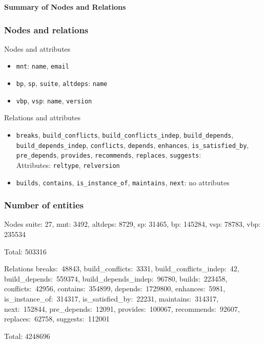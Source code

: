 \documentclass[hyperref]{beamer}
\newcommand{\cutin}[1]{%
\begin{frame}[c]\begin{center}{\Large\bf\color{myblue}#1}\end{center}\end{frame}}
\begin{document}
\cutin{Summary of Nodes and Relations}

\begin{frame}
  \frametitle{Nodes and relations}
  \begin{block}{Nodes and attributes}
    \begin{itemize}
    \item \texttt{mnt}: \texttt{name}, \texttt{email}
    \item \texttt{bp}, \texttt{sp}, \texttt{suite}, \texttt{altdeps}: \texttt{name}
    \item \texttt{vbp}, \texttt{vsp}: \texttt{name}, \texttt{version}
    \end{itemize}
  \end{block}

  \begin{block}{Relations and attributes}
    \begin{itemize}
    \item \texttt{breaks}, \texttt{build\_conflicts},
      \texttt{build\_conflicts\_indep}, \texttt{build\_depends},
      \texttt{build\_depends\_indep}, \texttt{conflicts},
      \texttt{depends}, \texttt{enhances}, \texttt{is\_satisfied\_by},
      \texttt{pre\_depends}, \texttt{provides}, \texttt{recommends}, 
      \texttt{replaces}, \texttt{suggests}:\\
      Attributes: \texttt{reltype}, \texttt{relversion}
    \item \texttt{builds}, \texttt{contains},
      \texttt{is\_instance\_of}, \texttt{maintains}, \texttt{next}: no attributes
    \end{itemize}
  \end{block}
\end{frame}

\begin{frame}
  \frametitle{Number of entities}
  \begin{block}{Nodes}
    suite: 27, mnt: 3492, altdeps: 8729, sp: 31465, bp: 145284, vsp:
    78783, vbp: 235534

    \bigskip
    Total: 503316
  \end{block}

  \begin{block}{Relations}
    breaks:~48843, build\_conflicts:~3331,
    build\_conflicts\_indep:~42, build\_depends:~559374,
    build\_depends\_indep:~96780, builds:~223458, conflicts:~42956,
    contains:~354899, depends:~1729800, enhances:~5981,
    is\_instance\_of:~314317, is\_satisfied\_by:~22231,
    maintains:~314317, next:~152844, pre\_depends:~12091,
    provides:~100067, recommends:~92607, replaces:~62758,
    suggests:~112001

    \bigskip
    Total: 4248696
  \end{block}
\end{frame}
\end{document}
